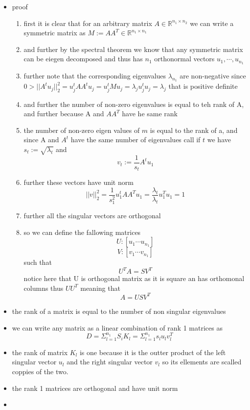 \documentclass{article}
\begin{document}
\begin{itemize}
\item proof
\begin{enumerate}
    \item first it is clear that for an arbitrary matrix $A\in \mathbb{R}^{n_1\times n_2}$ we can write a symmetric matrix as $M:=AA^{T}\in \mathbb{R}^{n_1\times n_1}$
    \item and further by the spectral theorem we know that any symmetric matrix can be eiegen decomposed and thus has $n_1$ orthonormal vectors $u_1,\cdots , u_{n_1}$
    \item further note that the corresponding eigenvalues $\lambda_{n_1}$ are non-negative since $0> ||A^{t}u_{j}||_{2}^{2}=u_{j}^{t}AA^{t}u_{j}=u_{j}^{t}Mu_{j}=\lambda_{j}u_{j}^{t}u_{j}=\lambda_{j}$ that is positive definite
    \item and further the number of non-zero eigenvalues is equal to teh rank of A, and further because A and $AA^{T}$ have he same rank  
    \item the  number of non-zero eigen values of $m$ is equal to the rank of a, and since A and $A^{t}$ have the same number of eigenvalues call if $t$ we have $s_{t}:=\sqrt{\lambda_{t}}$ and $$v_{t}:=\frac{1}{s_{t}}A^tu_{1}$$
    \item further these vectors have unit norm $$||v||_{2}^{2}=\frac{1}{s_{1}^2}u_{1}^{t}AA^{T}u_{1}=\frac{\lambda _t}{\lambda_t}u_{1}^{T}u_{1}=1$$
    \item further all the singular vectors are orthogonal
    \item so we can define the fallowing matrices $$U:[u_1\cdots u_{n_1}]$$ $$V:[v_1\cdots v_{n_1}]$$ such that $$U^TA=SV^T$$
    notice here that U is orthogonal  matrix as it is square an has orthomonal columns thus $UU^{T}$ meaning that $$A=USV^T$$
\end{enumerate}
\item the rank of a matrix is equal to the number of non singular eigenvalues
\item we can write any matrix as a linear combination of rank 1 matrices as $$D=\Sigma_{l=1}^{n_1}S_{i}K_{l}=\Sigma_{l=1}^{n_1}s_{l}u_{l}v_{l}^{T}$$
\item the rank of matrix $K_{l}$ is one because it is the outter product of the left singular vector $u_{l}$ and the right singular vector $v_{l}$ so its ellements are scalled coppies of the two. 
\item the rank 1 matrices are orthogonal and have unit norm 
\item 
\end{itemize}
\end{document}
